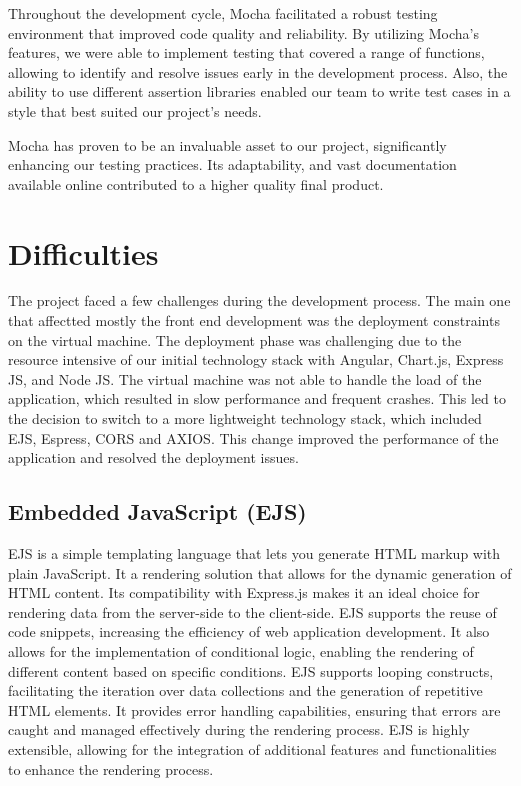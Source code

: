 Throughout the development cycle, Mocha facilitated a robust testing environment that improved code quality and reliability. By utilizing Mocha's features, we were able to 
implement testing that covered a range of functions, allowing to identify and resolve issues early in the development process. 
Also, the ability to use different assertion libraries enabled our team to write test cases in a style that best suited our project's needs.

Mocha has proven to be an invaluable asset to our project, significantly enhancing our testing practices. Its adaptability, and vast documentation available online contributed 
to a higher quality final product.


\section{Difficulties}

The project faced a few challenges during the development process. The main one that affectted mostly the front end development was the deployment constraints on the virtual machine.
The deployment phase was challenging due to the resource intensive of our initial technology stack with Angular, Chart.js, Express JS, and Node JS. The virtual machine was not able
to handle the load of the application, which resulted in slow performance and frequent crashes. This led to the decision to switch to a more lightweight technology stack, 
which included EJS, Espress, CORS and AXIOS. This change improved the performance of the application and resolved the deployment issues.

\subsection{Embedded JavaScript (EJS)}

EJS is a simple templating language that lets you generate HTML markup with plain JavaScript. It a rendering solution that allows for the dynamic generation of HTML content. \cite{ejs}
Its compatibility with Express.js makes it an ideal choice for rendering data from the server-side to the client-side. EJS supports the reuse of code snippets, increasing the efficiency of web application development. 
It also allows for the implementation of conditional logic, enabling the rendering of different content based on specific conditions. EJS supports looping constructs, facilitating the iteration over data collections 
and the generation of repetitive HTML elements. It provides error handling capabilities, ensuring that errors are caught and managed effectively during the rendering process. EJS is highly extensible,
allowing for the integration of additional features and functionalities to enhance the rendering process. \cite{ejs}

